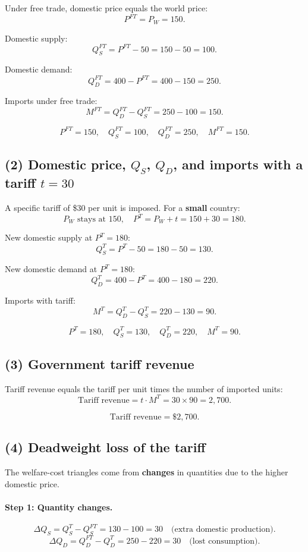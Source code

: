 \documentclass[12pt]{article}
\begin{document}
Under free trade, domestic price equals the world price:
\[
P^{FT} = P_W = 150.
\]

Domestic supply:
\[
Q_S^{FT} = P^{FT} - 50 = 150 - 50 = 100.
\]

Domestic demand:
\[
Q_D^{FT} = 400 - P^{FT} = 400 - 150 = 250.
\]

Imports under free trade:
\[
M^{FT} = Q_D^{FT} - Q_S^{FT} = 250 - 100 = 150.
\]

\[
\boxed{P^{FT} = 150,\quad Q_S^{FT} = 100,\quad Q_D^{FT} = 250,\quad M^{FT} = 150.}
\]

\subsection*{(2) Domestic price, $Q_S$, $Q_D$, and imports with a tariff $t = 30$}

A specific tariff of \$30 per unit is imposed. For a \textbf{small} country:
\[
P_W \text{ stays at } 150,\quad P^{T} = P_W + t = 150 + 30 = 180.
\]

New domestic supply at $P^{T}=180$:
\[
Q_S^{T} = P^{T} - 50 = 180 - 50 = 130.
\]

New domestic demand at $P^{T}=180$:
\[
Q_D^{T} = 400 - P^{T} = 400 - 180 = 220.
\]

Imports with tariff:
\[
M^{T} = Q_D^{T} - Q_S^{T} = 220 - 130 = 90.
\]

\[
\boxed{P^{T} = 180,\quad Q_S^{T} = 130,\quad Q_D^{T} = 220,\quad M^{T} = 90.}
\]

\subsection*{(3) Government tariff revenue}

Tariff revenue equals the tariff per unit times the number of imported units:
\[
\text{Tariff revenue} = t \cdot M^{T} = 30 \times 90 = 2{,}700.
\]

\[
\boxed{\text{Tariff revenue} = \$2{,}700.}
\]

\subsection*{(4) Deadweight loss of the tariff}

The welfare-cost triangles come from \textbf{changes} in quantities due to the higher domestic price.

\paragraph{Step 1: Quantity changes.}
\[
\Delta Q_S = Q_S^{T} - Q_S^{FT} = 130 - 100 = 30 \quad \text{(extra domestic production)}.
\]
\[
\Delta Q_D = Q_D^{FT} - Q_D^{T} = 250 - 220 = 30 \quad \text{(lost consumption)}.
\]
\end{document}
